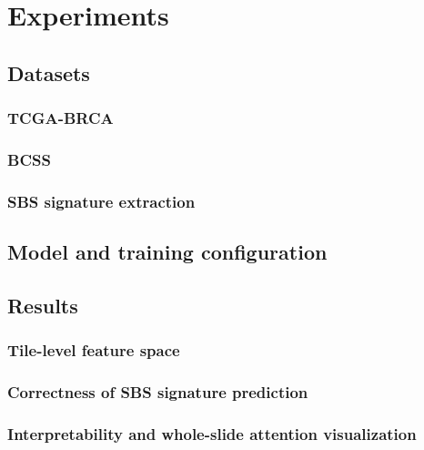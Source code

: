 \section{Experiments}\label{sec:exp}

\subsection{Datasets}\label{sec:exp/data}

\subsubsection{TCGA-BRCA}

\subsubsection{BCSS}

\subsubsection{SBS signature extraction}

\subsection{Model and training configuration}\label{sec:exp/config}

\subsection{Results}

\subsubsection{Tile-level feature space}

\subsubsection{Correctness of SBS signature prediction}

\subsubsection{Interpretability and whole-slide attention visualization}

